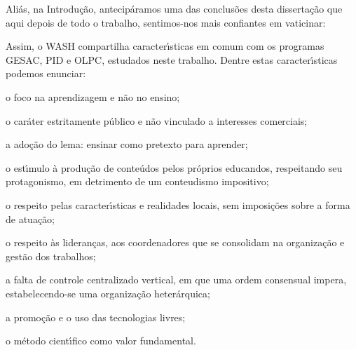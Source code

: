 \documentclass[
12pt,		%
openright,	%
twoside,  %
a4paper,			%
chapter=TITLE,		%
english,			%
french,				%
spanish,			%
brazil				%
]{USPSC-classe/USPSC}
\begin{document}
Ali\'as, na Introdu\c{c}\~ao, antecip\'aramos uma das conclus\~oes desta disserta\c{c}\~ao que aqui depois de todo o trabalho,  sentimos-nos mais confiantes em vaticinar:










\noindent\begin{center}\mbox{\centering{}}\end{center}


Assim,  o WASH compartilha caracter\'{\i}sticas em comum com os programas GESAC, PID e OLPC, estudados neste trabalho. Dentre estas caracter\'{\i}sticas podemos enunciar:










\begin{alineas}
\item o foco na aprendizagem e n\~ao no ensino;
\item o car\'ater estritamente p\'ublico e n\~ao vinculado a interesses comerciais;
\item a ado\c{c}\~ao do lema: \textquotedbl ensinar como pretexto para aprender\textquotedbl ;
\item o est\'{\i}mulo \`a produ\c{c}\~ao de conte\'udos pelos pr\'oprios educandos, respeitando seu protagonismo, em detrimento de um \textquotedbl conteudismo impositivo\textquotedbl ;
\item o respeito pelas caracter\'{\i}sticas e realidades locais, sem imposi\c{c}\~oes sobre a forma de atua\c{c}\~ao;
\item o respeito \`as lideran\c{c}as, aos coordenadores que se consolidam na organiza\c{c}\~ao e gest\~ao dos trabalhos;
\item a falta de controle centralizado vertical, em que uma ordem consensual impera, estabelecendo-se uma organiza\c{c}\~ao heter\'arquica;
\item a promo\c{c}\~ao e o uso das tecnologias livres;
\item o m\'etodo cient\'{\i}fico como valor fundamental.
\end{alineas}
\end{document}
